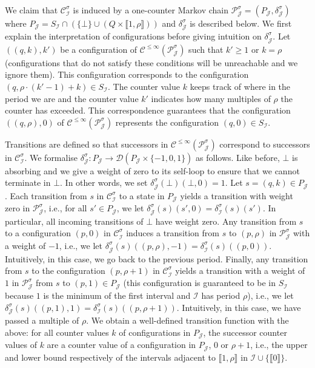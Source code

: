 \documentclass[a4paper,UKenglish,cleveref,autoref,thm-restate,colorlinks]{lipics-v2021}
\newcommand{\integerInterval}[1]{\llbracket{}#1\rrbracket{}}
\newcommand{\dist}[1]{\mathcal{D}(#1)}
\newcommand{\mdpStateSpace}{S}
\newcommand{\mdpTrans}{\delta}
\newcommand{\ocStateSpace}{Q}
\newcommand{\ocState}{q}
\newcommand{\ocStateB}{p}
\newcommand{\ocCount}{k}
\newcommand{\ocCountB}{k'}
\newcommand{\ocConfig}{s}
\newcommand{\ocTrans}{\delta}
\newcommand{\period}{\rho}
\newcommand{\mchain}{\mathcal{C}}
\newcommand{\ocChain}{\mathcal{P}}
\newcommand{\ocChainFin}[2]{\mchain^{\leq #2}(#1)}
\newcommand{\intPart}{\mathcal{I}}
\newcommand{\intPartB}{\mathcal{J}}
\newcommand{\compressChainStrat}[1]{\mchain^{#1}_{\intPart}}
\newcommand{\compressChain}{\compressChainStrat{\strat}}
\newcommand{\compressChainStateSpace}{\mdpStateSpace_{\intPart}}
\newcommand{\compressChainTransTemplate}[2]{\mdpTrans^{#1}_{#2}}
\newcommand{\compressChainTrans}{\compressChainTransTemplate{\strat}{\intPart}}
\newcommand{\cisChainStrat}[1]{\ocChain^{#1}_{\intPartB}}
\newcommand{\cisChain}{\cisChainStrat{\strat}}
\newcommand{\cisChainStateSpace}{P_{\intPartB}}
\newcommand{\cisChainTransTemplate}[2]{\ocTrans_{#1}^{#2}}
\newcommand{\cisChainTrans}{\cisChainTransTemplate{\intPartB}{\strat}}
\newcommand{\stratGeneric}[1]{{\sigma_{#1}}}
\newcommand{\strat}{\stratGeneric{}}
\begin{document}
We claim that $\compressChain$ is induced by a one-counter Markov chain $\cisChain=(\cisChainStateSpace, \cisChainTrans)$  where $\cisChainStateSpace = \compressChainStateSpace\cap(\{\bot\}\cup(\ocStateSpace\times\integerInterval{1, \period}))$  and $\cisChainTrans$ is described below.
We first explain the interpretation of configurations before giving intuition on $\cisChainTrans$.
Let $((\ocState, \ocCount), \ocCountB)$ be a configuration of $\ocChainFin{\cisChain}{\infty}$ such that $\ocCountB\geq 1$ or $\ocCount=\period$ (configurations that do not satisfy these conditions will be unreachable and we ignore them).
This configuration corresponds to the configuration $(\ocState, \period\cdot(\ocCount'-1) +\ocCount)\in\compressChainStateSpace$.
The counter value $\ocCount$ keeps track of where in the period we are and the counter value $\ocCount'$ indicates how many multiples of $\period$ the counter has exceeded.
This correspondence guarantees that the configuration $((\ocState, \period), 0)$ of $\ocChainFin{\cisChain}{\infty}$ represents the configuration $(\ocState, 0)\in\compressChainStateSpace$.

Transitions are defined so that successors in $\ocChainFin{\cisChain}{\infty}$ correspond to successors in $\compressChain$.
We formalise $\cisChainTrans\colon\cisChainStateSpace\to\dist{\cisChainStateSpace\times\{-1, 0, 1\}}$ as follows.
Like before, $\bot$ is absorbing and we give a weight of zero to its self-loop to ensure that we cannot terminate in $\bot$.
In other words, we set $\cisChainTrans(\bot)(\bot, 0)=1$.
Let $\ocConfig=(\ocState, \ocCount)\in\cisChainStateSpace$.
Each transition from $\ocConfig$ in $\compressChain$ to a state in $\cisChainStateSpace$ yields a transition with weight zero in $\cisChain$, i.e., for all $\ocConfig'\in\cisChainStateSpace$, we let $\cisChainTrans(\ocConfig)(\ocConfig', 0) = \compressChainTrans(\ocConfig)(\ocConfig')$.
In particular, all incoming transitions of $\bot$ have weight zero.
Any transition from $\ocConfig$ to a configuration $(\ocStateB, 0)$ in $\compressChain$ induces a transition from $\ocConfig$ to $(\ocStateB, \period)$ in $\cisChain$ with a weight of $-1$, i.e., we let $\cisChainTrans(\ocConfig)((\ocStateB, \period), -1) = \compressChainTrans(\ocConfig)((\ocStateB, 0))$.
Intuitively, in this case, we go back to the previous period.
Finally, any transition from $\ocConfig$ to the configuration $(\ocStateB, \period+1)$ in $\compressChain$ yields a transition with a weight of $1$ in $\cisChain$ from $\ocConfig$ to $(\ocStateB, 1)\in\cisChainStateSpace$ (this configuration is guaranteed to be in $\compressChainStateSpace$ because $1$ is the minimum of the first interval and $\intPart$ has period $\period$), i.e., we let $\cisChainTrans(\ocConfig)((\ocStateB, 1), 1) = \compressChainTrans(\ocConfig)((\ocStateB, \period+1))$.
Intuitively, in this case, we have passed a multiple of $\period$.
We obtain a well-defined transition function with the above: for all counter values $\ocCount$ of configurations in $\cisChainStateSpace$, the successor counter values of $\ocCount$ are a counter value of a configuration in $\cisChainStateSpace$, $0$ or $\period+1$, i.e., the upper and lower bound respectively of the intervals adjacent to $\integerInterval{1, \period}$ in $\intPart\cup\{\integerInterval{0}\}$.
\end{document}
